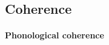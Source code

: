 \documentclass[man,floatsintext]{apa6}
\begin{document}

\subsection{Coherence}

\paragraph{Phonological coherence}
\end{document}

